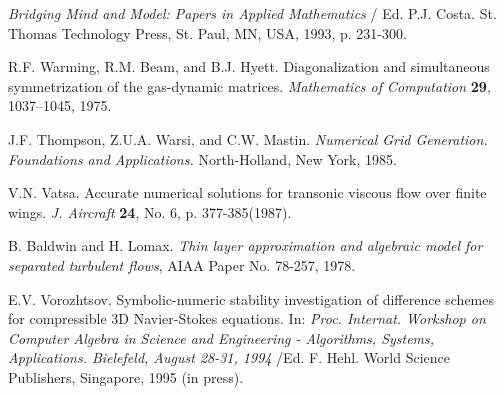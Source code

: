 \begin{description}
{\em Bridging Mind and Model: Papers in Applied Mathematics} / Ed. P.J. Costa.
St. Thomas Technology Press, St. Paul, MN, USA, 1993, p. 231-300.
\item[19.]
R.F. Warming, R.M. Beam, and B.J. Hyett. Diagonalization and simultaneous
symmetrization of the gas-dynamic matrices. {\em Mathematics of Computation}
{\bf 29}, 1037--1045, 1975.
\item[20.]
J.F. Thompson, Z.U.A. Warsi, and C.W. Mastin. {\em Numerical Grid Generation.
Foundations and Applications.} North-Holland, New York, 1985.
\item[21.]
V.N. Vatsa. Accurate numerical solutions for transonic viscous
flow over finite wings. {\em J. Aircraft} {\bf 24}, No. 6, p. 377-385(1987).
\item[22.]
B. Baldwin and H. Lomax. {\it Thin layer approximation and algebraic model
     for separated turbulent flows}, AIAA Paper No. 78-257, 1978.
\item[23.]
E.V. Vorozhtsov. Symbolic-numeric stability investigation of difference
schemes for compressible 3D Navier-Stokes equations. In: {\em Proc. Internat.
Workshop on Computer Algebra in Science and Engineering - Algorithms, Systems,
Applications. Bielefeld, August 28-31, 1994} /Ed. F. Hehl. World Science
Publishers, Singapore, 1995 (in press).
\end{description}

